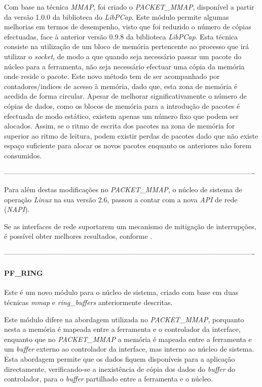 Com base na técnica \textit{MMAP}, foi criado o \textit{PACKET\_MMAP}, disponível a partir da versão 1.0.0 da biblioteca do \textit{LibPCap}.
Este módulo permite algumas melhorias em termos de desempenho, visto que foi reduzido o número de cópias efectuadas, face à anterior versão 0.9.8 da biblioteca \textit{LibPCap}.
Esta técnica consiste na utilização de um bloco de memória pertencente ao processo que irá utilizar o \textit{socket}, de modo a que quando seja necessário passar um pacote do núcleo para a ferramenta, não seja necessário efectuar uma cópia da memória onde reside o pacote.
Este novo método tem de ser acompanhado por contadores/indices de acesso à memória, dado que, esta zona de memória é acedida de forma circular.
Apesar de melhorar significativamente o número de cópias de dados, como os blocos de memória para a introdução de pacotes é efectuada de modo estático, existem apenas um número fixo que podem ser alocados.
Assim, se o ritmo de escrita dos pacotes na zona de memória for superior ao ritmo de leitura, podem existir perdas de pacotes dado que não existe espaço suficiente para alocar os novos pacotes enquanto os anteriores não forem consumidos.

----------------------------------------------------------------------------------------------------------

Para além destas modificações no \textit{PACKET\_MMAP}, o núcleo de sistema de operação \textit{Linux} na sua versão 2.6, passou a contar com a nova \textit{API} de rede (\textit{NAPI}).

Se as interfaces de rede suportarem um mecanismo de mitigação de interrupções, é possível obter melhores resultados, conforme \cite{Deri2004}.

----------------------------------------------------------------------------------------------------------

\paragraph*{PF\_RING}

Este é um novo módulo para o núcleo de sistema, criado com base em duas técnicas \textit{mmap} e \textit{ring\_buffers} anteriormente descritas.

Este módulo difere na abordagem utilizada no \textit{PACKET\_MMAP}, porquanto nesta a memória é mapeada entre a ferramenta e o controlador da interface, enquanto que no \textit{PACKET\_MMAP} a memória é mapeada entre a ferramenta e um \textit{buffer} externo ao controlador da interface, mas interno ao núcleo de sistema.
Esta abordagem permite que os dados fiquem disponíveis para a aplicação directamente, verificando-se a inexistência de cópia dos dados do \textit{buffer} do controlador, para o \textit{buffer} partilhado entre a ferramenta e o núcleo\cite{PFRING}.
 

